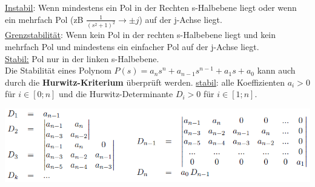 \noindent\underline{Instabil}: Wenn mindestens ein Pol in der Rechten s-Halbebene liegt oder wenn ein mehrfach Pol (zB $\frac{1}{(s^2 + 1)^2} \rightarrow \pm j$) auf der j-Achse liegt.\\
\underline{Grenzstabilität}: Wenn kein Pol in der rechten s-Halbebene liegt und kein mehrfach Pol und mindestens ein einfacher Pol auf der j-Achse liegt.\\
\underline{Stabil:} Pol nur in der linken s-Halbebene.\\

\noindent Die Stabilität eines Polynom $P(s) = a_ns^n + a_{n-1}s^{n-1}+a_1s + a_0$ kann auch durch die \textbf{Hurwitz-Kriterium} überprüft werden. 
\underline{stabil}: alle Koeffizienten $a_i > 0$ für $i \in [0;n]$ und die Hurwitz-Determinante $D_i > 0$ für $i\in[1;n]$.

\includegraphics[width=\columnwidth]{Images/hurwitz}

